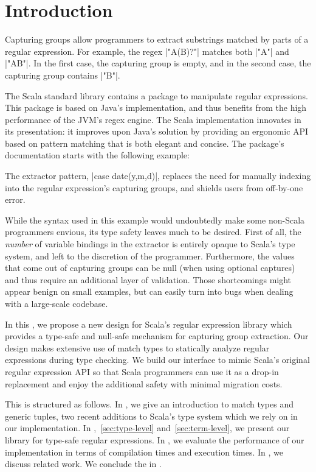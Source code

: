 \def\paper{\thesisOnly{chapter}\paperOnly{paper}}
\section{Introduction}

Capturing groups allow programmers to extract substrings matched by parts of a regular expression.
For example, the regex |"A(B)?"| matches both |"A"| and |"AB"|.
In the first case, the capturing group is empty, and in the second case, the capturing group contains |"B"|.

The Scala standard library contains a package to manipulate regular expressions.
This package is based on Java's implementation, and thus benefits from the high performance of the JVM's regex engine.
The Scala implementation innovates in its presentation: it improves upon Java's solution by providing an ergonomic API based on pattern matching that is both elegant and concise.
The package's documentation starts with the following example:

\regexDocumentation

\noindent
The extractor pattern, |case date(y,m,d)|, replaces the need for manually indexing into the regular expression's capturing groups, and shields users from off-by-one error.

While the syntax used in this example would undoubtedly make some non-Scala programmers envious, its type safety leaves much to be desired.
First of all, the \emph{number} of variable bindings in the extractor is entirely opaque to Scala's type system, and left to the discretion of the programmer.
Furthermore, the values that come out of capturing groups can be null (when using optional captures) and thus require an additional layer of validation.
Those shortcomings might appear benign on small examples, but can easily turn into bugs when dealing with a large-scale codebase.

In this \paper, we propose a new design for Scala's regular expression library which provides a type-safe and null-safe mechanism for capturing group extraction.
Our design makes extensive use of match types to statically analyze regular expressions during type checking.
We build our interface to mimic Scala's original regular expression API so that Scala programmers can use it as a drop-in replacement and enjoy the additional safety with minimal migration costs.

This \paper is structured as follows.
In , we give an introduction to match types and generic tuples, two recent additions to Scala's type system which we rely on in our implementation.
In ,~\ref{sec:type-level} and~\ref{sec:term-level}, we present our library for type-safe regular expressions.
In , we evaluate the performance of our implementation in terms of compilation times and execution times.
In , we discuss related work.
We conclude the \paper in .

